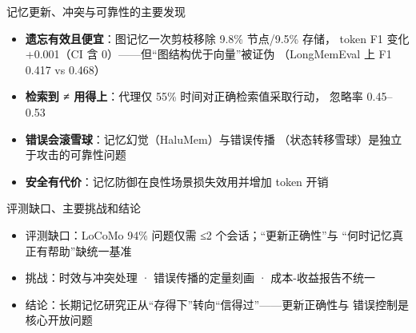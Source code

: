 \documentclass[UTF8, aspectratio=169]{ctexbeamer}
\begin{document}
\begin{frame}{记忆更新、冲突与可靠性的主要发现}
\begin{itemize}
  \item \textbf{遗忘有效且便宜}：图记忆一次剪枝移除 9.8\% 节点/9.5\% 存储，
        token F1 变化 +0.001（CI 含 0）——但``图结构优于向量''被证伪
        （LongMemEval 上 F1 0.417 vs 0.468）
  \item \textbf{检索到 ≠ 用得上}：代理仅 55\% 时间对正确检索值采取行动，
        忽略率 0.45–0.53
  \item \textbf{错误会滚雪球}：记忆幻觉（HaluMem）与错误传播
        （状态转移雪球）是独立于攻击的可靠性问题
  \item \textbf{安全有代价}：记忆防御在良性场景损失效用并增加 token 开销
\end{itemize}
\end{frame}

\begin{frame}{评测缺口、主要挑战和结论}
\begin{itemize}
  \item 评测缺口：LoCoMo 94\% 问题仅需 ≤2 个会话；``更新正确性''与
        ``何时记忆真正有帮助''缺统一基准
  \item 挑战：时效与冲突处理 · 错误传播的定量刻画 · 成本-收益报告不统一
  \item 结论：长期记忆研究正从``存得下''转向``信得过''——更新正确性与
        错误控制是核心开放问题
\end{itemize}
\end{frame}
\end{document}
